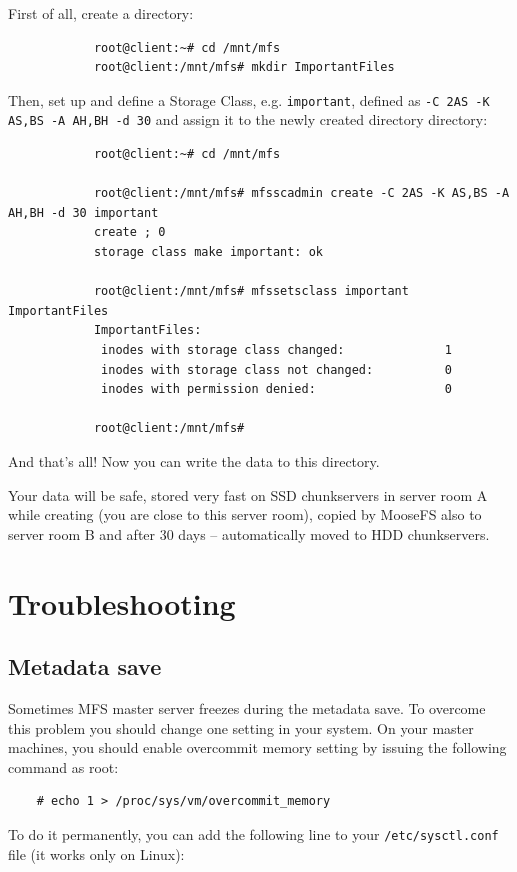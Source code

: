 \documentclass[a4paper,11pt,english]{report}
\def\code#1{\texttt{#1}}
\begin{document}
			First of all, create a directory:
			
			\begin{lstlisting}
			root@client:~# cd /mnt/mfs
			root@client:/mnt/mfs# mkdir ImportantFiles
			\end{lstlisting}
			
			Then, set up and define a Storage Class, e.g. \code{important}, defined as \code{-C 2AS -K AS,BS -A AH,BH -d 30} and assign it to the newly created directory directory:
			
			\begin{lstlisting}
			root@client:~# cd /mnt/mfs
			
			root@client:/mnt/mfs# mfsscadmin create -C 2AS -K AS,BS -A AH,BH -d 30 important
			create ; 0
			storage class make important: ok
			
			root@client:/mnt/mfs# mfssetsclass important ImportantFiles
			ImportantFiles:
			 inodes with storage class changed:              1
			 inodes with storage class not changed:          0
			 inodes with permission denied:                  0
			 
			root@client:/mnt/mfs#
			\end{lstlisting}
			
			And that's all! Now you can write the data to this directory.
			
			Your data will be safe, stored very fast on SSD chunkservers in server room A while creating (you are close to this server room), copied by MooseFS also to server room B and after 30 days -- automatically moved to HDD chunkservers.
			
	\chapter{Troubleshooting}
	
		\section{Metadata save}
		Sometimes MFS master server freezes during the metadata save. To overcome this problem you should change one setting in your system. On your master machines, you should enable overcommit memory setting by issuing the following command as root:

		\begin{lstlisting}
	# echo 1 > /proc/sys/vm/overcommit_memory
		\end{lstlisting}

		To do it permanently, you can add the following line to your \code{/etc/sysctl.conf} file (it works only on Linux):
\end{document}
